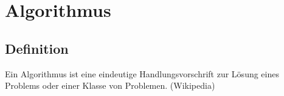 \section{Algorithmus}

\subsection{Definition}
Ein Algorithmus ist eine eindeutige Handlungsvorschrift zur Lösung eines Problems oder einer Klasse von Problemen. (Wikipedia)
